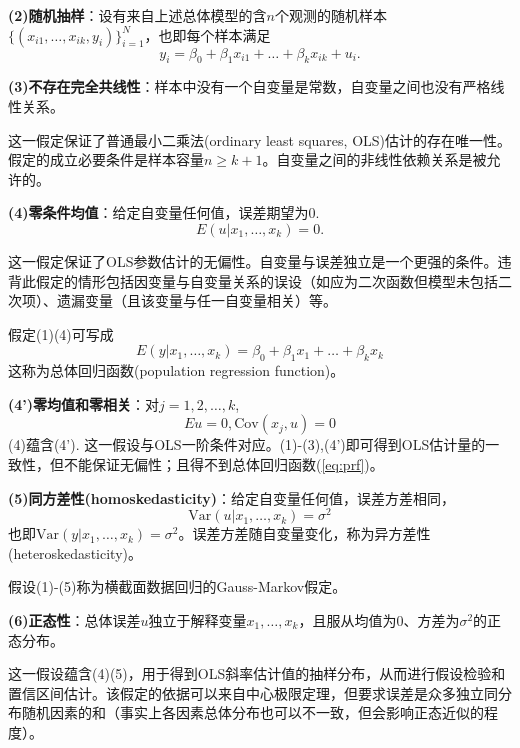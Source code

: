 \par \textbf{(2)随机抽样}：设有来自上述总体模型的含$n$个观测的随机样本$\{(x_{i1}, \dots, x_{ik}, y_i)\}_{i=1}^N$，也即每个样本满足
\begin{equation}
    y_i=\beta_0+\beta_1 x_{i1}+\dots+\beta_k x_{ik} +u_i.
\end{equation}

\par \textbf{(3)不存在完全共线性}：样本中没有一个自变量是常数，自变量之间也没有严格线性关系。
\par 这一假定保证了普通最小二乘法(ordinary least squares, OLS)估计的存在唯一性。假定的成立必要条件是样本容量$n\ge k+1$。自变量之间的非线性依赖关系是被允许的。

\par \textbf{(4)零条件均值}：给定自变量任何值，误差期望为0.
\begin{equation}
    E(u\vert x_1, \dots, x_k)=0.
\end{equation}
\par 这一假定保证了OLS参数估计的无偏性。自变量与误差独立是一个更强的条件。违背此假定的情形包括因变量与自变量关系的误设（如应为二次函数但模型未包括二次项）、遗漏变量（且该变量与任一自变量相关）等。
\par 假定(1)(4)可写成
\begin{equation}
    E(y\vert x_1,\dots,x_k)=\beta_0+\beta_1 x_1+\dots+\beta_k x_k \label{eq:prf}
\end{equation}
这称为总体回归函数(population regression function)。

\par \textbf{(4')零均值和零相关}：对$j=1,2,\dots,k$,
\begin{equation}
    Eu=0, \text{Cov}(x_j,u)=0
\end{equation}
(4)蕴含(4'). 这一假设与OLS一阶条件对应。(1)-(3),(4')即可得到OLS估计量的一致性，但不能保证无偏性；且得不到总体回归函数(\ref{eq:prf})。

\par \textbf{(5)同方差性(homoskedasticity)}：给定自变量任何值，误差方差相同，
\begin{equation}
    \text{Var}(u\vert x_1, \dots, x_k)=\sigma^2
\end{equation}
也即$\text{Var}(y\vert x_1, \dots, x_k)=\sigma^2$。误差方差随自变量变化，称为异方差性(heteroskedasticity)。
\par 假设(1)-(5)称为横截面数据回归的Gauss-Markov假定。

\par \textbf{(6)正态性}：总体误差$u$独立于解释变量$x_1,\dots,x_k$，且服从均值为0、方差为$\sigma^2$的正态分布。
\par 这一假设蕴含(4)(5)，用于得到OLS斜率估计值的抽样分布，从而进行假设检验和置信区间估计。该假定的依据可以来自中心极限定理，但要求误差是众多独立同分布随机因素的和（事实上各因素总体分布也可以不一致，但会影响正态近似的程度）。

